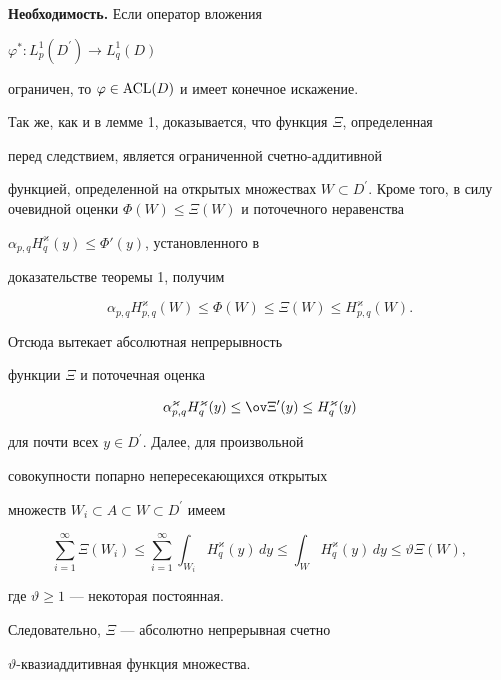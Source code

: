 \begin{pf}


{\bf Необходимость.} Если оператор вложения


$\varphi^{*} :L_{p}^{1}(D^{\prime})\to L_{q}^{1}(D)$


ограничен, то $\varphi\in\operatorname{ACL}(D)$ и имеет конечное искажение.


Так же, как и в лемме 1, доказывается, что функция $\Xi$, определенная


перед следствием, является ограниченной счетно-аддитивной


функцией, определенной на открытых множествах $W\subset


D^{\prime}$. Кроме того, в силу очевидной оценки $\Phi(W)\leq


\Xi(W)$ и поточечного неравенства


$\alpha_{p,q}H^{\varkappa}_q(y)\leq\Phi'(y)$, установленного в


доказательстве теоремы 1, получим


$$


\alpha_{p,q}H^\varkappa_{p,q}(W)\leq \Phi(W)\leq \Xi(W)\leq


H^\varkappa_{p,q}(W).


$$


Отсюда вытекает абсолютная непрерывность


функции $\Xi$ и поточечная оценка


$$


\alpha^\varkappa_{p,q}


H^\varkappa_q(y)\leq \ov\Xi{}^{\prime}(y)\leq H^\varkappa_q(y)


$$


для почти всех $y\in D^{\prime}$. Далее, для произвольной


совокупности попарно непересекающихся открытых


множеств $W_i\subset A\subset W\subset D^{\prime}$ имеем


$$


\sum_{i=1}^\infty\Xi(W_i)\leq \sum_{i=1}^\infty\int_{W_i}


H^{\varkappa}_q(y)\,dy\leq


\int_{W}H^{\varkappa}_q(y)\,dy\leq \vartheta\Xi(W),


$$


где $\vartheta\geq1$ --- некоторая постоянная.


Следовательно, $\Xi$ --- абсолютно непрерывная счетно


$\vartheta$-квазиаддитивная функция множества.



\end{pf}
